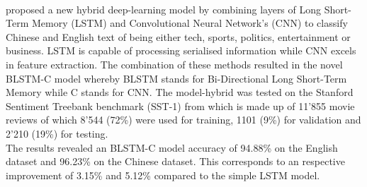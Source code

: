 \paragraph*{\textcite{Li2018}} proposed a new hybrid deep-learning model by combining layers of Long Short-Term Memory (LSTM) and Convolutional Neural Network's (CNN) to classify Chinese and English text of being either tech, sports, politics, entertainment or business. LSTM is capable of processing serialised information while CNN excels in feature extraction. The combination of these methods resulted in the novel BLSTM-C model whereby BLSTM stands for Bi-Directional Long Short-Term Memory while C stands for CNN. The model-hybrid was tested on the Stanford Sentiment Treebank benchmark (SST-1) from \textcite{Socher2013} which is made up of 11'855 movie reviews of which 8'544 (72\%) were used for training, 1101 (9\%) for validation and 2'210 (19\%) for testing. \\The results revealed an BLSTM-C model accuracy
of 94.88\% on the English dataset and 96.23\% on the Chinese dataset. This corresponds to an respective improvement of 3.15\% and 5.12\% compared to the simple LSTM model.


